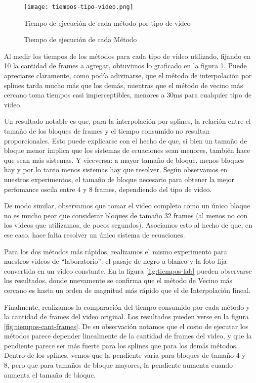 \begin{figure}[h!]
  \centering
    \texttt{[image: tiempos-tipo-video.png]}
     \caption{Tiempo de ejecución de cada método por tipo de video}\label{fig:tiempos}
\end{figure}
\noindent


\begin{figure}[h!]
\centering
    \caption{Tiempo de ejecuci\'on de cada M\'etodo}
\end{figure}

Al medir los tiempos de los métodos para cada tipo de video utilizado, fijando en 10 la cantidad de frames a agregar, obtuvimos lo graficado en la figura \ref{fig:tiempos}. Puede apreciarse claramente, como podía adivinarse, que el método de interpolación por splines tarda mucho más que los demás, mientras que el método de vecino más cercano toma tiempos casi imperceptibles, menores a 30ms para cualquier tipo de video.

Un resultado notable es que, para la interpolación por splines, la relación entre el tamaño de los bloques de frames y el tiempo consumido no resultan proporcionales. Esto puede explicarse con el hecho de que, si bien un tamaño de bloque menor implica que los sistemas de ecuaciones sean menores, también hace que sean más sistemas. Y viceversa: a mayor tamaño de bloque, menos bloques hay y por lo tanto menos sistemas hay que resolver. Según observamos en nuestros experimentos, el tamaño de bloque necesario para obtener la mejor perfomance oscila entre 4 y 8 frames, dependiendo del tipo de video.

De modo similar, observamos que tomar el video completo como un único bloque no es mucho peor que considerar bloques de tamaño 32 frames (al menos no con los videos que utilizamos, de pocos segundos). Asociamos esto al hecho de que, en ese caso, hace falta resolver un único sistema de ecuaciones.

Para los dos métodos más rápidos, realizamos el mismo experimento para nuestros videos de ``laboratorio'': el pasaje de negro a blanco y la foto fija convertida en un video constante. En la figura \ref{fig:tiempos-lab} pueden observarse los resultados, donde nuevamente se confirma que el método de Vecino más cercano es hasta un orden de magnitud más rápido que el de Interpolación lineal.

Finalmente, realizamos la comparación del tiempo consumido por cada método y la cantidad de frames del video original. Los resultados pueden verse en la figura \ref{fig:tiempos-cant-frames}. De su observación notamos que el costo de ejecutar los métodos parece depender linealmente de la cantidad de frames del video, y que la pendiente parece ser más fuerte para los splines que para los demás métodos. Dentro de los splines, vemos que la pendiente varía para bloques de tamaño 4 y 8, pero que para tamaños de bloque mayores, la pendiente aumenta cuando aumenta el tamaño de bloque.
